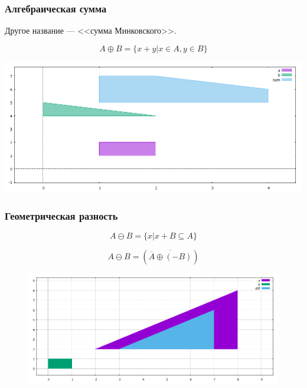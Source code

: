 \documentclass{beamer}
\begin{document}
  
  \begin{frame}
    \frametitle{Алгебраическая сумма}
    
    Другое название --- <<сумма Минковского>>.
    
    \begin{equation}
      A \oplus B =  \{ x + y | x \in A, y \in B \} 
    \end{equation}

    \includegraphics[width=1.0\textwidth]{sum}
  
  \end{frame}
  
  
  \begin{frame}
    \frametitle{Геометрическая разность}
    
    \begin{equation}
      A \ominus B =  \{ x | x + B \subseteq A \} 
    \end{equation}

    \begin{equation}
        A \ominus B =
        (\overline{\overline{A} \oplus (- B)})
    \end{equation}  

    \begin{figure}
        \includegraphics[scale=0.4]{diff}
    \end{figure}

  \end{frame}
  
\end{document}
